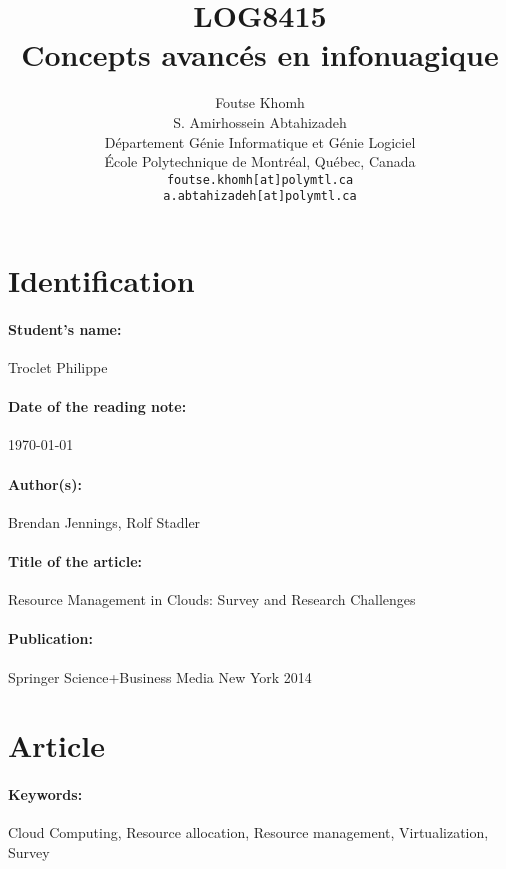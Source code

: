 \documentclass[11pt]{article}
\title{LOG8415\\Concepts avanc\'{e}s en infonuagique}
\author{
    Foutse Khomh \\
    S. Amirhossein Abtahizadeh \\
    D\'{e}partement G\'{e}nie Informatique et G\'{e}nie Logiciel \\
    \'{E}cole Polytechnique de Montr\'{e}al, Qu\'{e}bec, Canada \\
    \texttt{foutse.khomh[at]polymtl.ca} \\
    \texttt{a.abtahizadeh[at]polymtl.ca}
}
\date{}
\def\titre{}
\def\auteur{}
\begin{document}
\maketitle

\section{Identification}

\paragraph{Student's name:} \auteur Troclet Philippe

\paragraph{Date of the reading note:} \today

\paragraph{Author(s):} Brendan Jennings, Rolf Stadler

\paragraph{Title of the article:} \titre Resource Management in Clouds: Survey and Research Challenges

\paragraph{Publication:} Springer Science+Business Media New York 2014

\section{Article}

\paragraph{Keywords:} Cloud Computing, Resource allocation, Resource management, Virtualization, Survey
\end{document}
